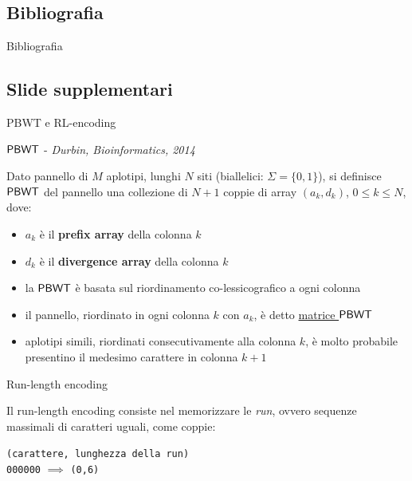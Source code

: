 \documentclass[]{beamer}
\def\PBWT{\mbox{\rm {\sf PBWT}}}
\begin{document}
\subsection{Bibliografia}
\nocite{*}
\begin{frame}[plain]{Bibliografia}
  \nocite{*}
  
  
\end{frame}
\begin{frame}[plain]{}
  
\end{frame}
\subsection{Slide supplementari}
\begin{frame}[plain]{PBWT e RL-encoding}
  \begin{block}{$\PBWT$ - {\footnotesize{\textit{Durbin, Bioinformatics,
            2014}}}} 
    \footnotesize{ Dato pannello di $M$ aplotipi, lunghi $N$ siti (biallelici:
      $\Sigma=\{0,1\}$), si definisce 
      $\PBWT$ del 
      pannello una collezione di $N+1$ coppie di array $(a_k,d_k)$, $0\leq k\leq
      N$, dove:
      \begin{itemize}
        \item $a_k$ è il \textbf{prefix array} della colonna $k$
        \item $d_k$ è il \textbf{divergence array} della colonna $k$
      \end{itemize}}
  \end{block}
  \begin{block}{}
    \footnotesize{\begin{itemize}
        \item la $\PBWT$ è basata sul riordinamento co-lessicografico a ogni
        colonna
        \item il pannello, riordinato in ogni colonna $k$ con $a_k$, è detto
        \underline{matrice $\PBWT$}
        \item aplotipi simili, riordinati consecutivamente alla colonna $k$, è
        molto probabile presentino il medesimo carattere in colonna $k+1$
      \end{itemize}}
  \end{block}
  
  \begin{block}{Run-length encoding}
    \footnotesize{Il run-length encoding consiste nel memorizzare le \textit{run}, ovvero
      sequenze massimali di caratteri uguali, come coppie: \\
      \vspace{-0.3cm}
      \begin{center}
        \texttt{(carattere, lunghezza della run)}\\
        \texttt{000000} $\implies$ \texttt{(0,6)}
      \end{center}}
  \end{block}
\end{frame}
\end{document}
